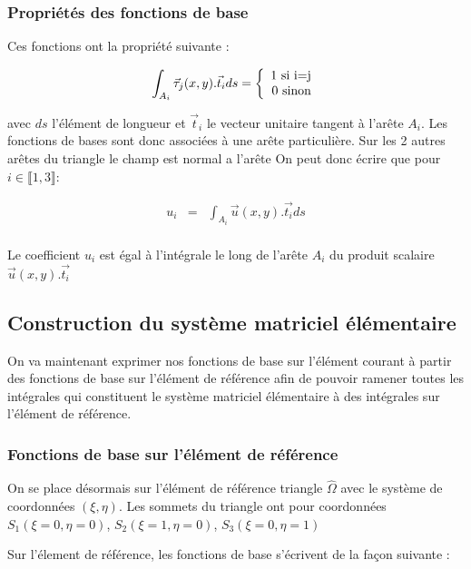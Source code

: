 \documentclass[a4paper,12pt]{article}
\begin{document}
\subsubsection{Propriétés des fonctions de base}
Ces fonctions ont la propriété suivante :

\[
  \int_{A_{i}} {\vec{\tau}_{j}(x,y).\vec{t}_{i} ds} = 
  \left\{
  \begin{array}{r c l}
  \text{1 si i=j}\\
  \text{0 sinon}
  \end{array}
  \right.
\]

avec $ds$ l'élément de longueur et  $\vec{t}_{i}$ le vecteur unitaire tangent à l'arête $A_{i}$. Les fonctions de bases sont donc associées à une arête particulière.
Sur les 2 autres arêtes du triangle le champ est normal a l'arête
On peut donc écrire que pour $i \in \llbracket 1,3 \rrbracket$:

\begin{eqnarray*}
u_{i} &=& \int_{A_{i}} {\vec{u}(x,y).\vec{t_{i}} ds}\\
\end{eqnarray*}

Le coefficient $u_{i}$ est égal à l'intégrale le long de l'arête $A_{i}$ du produit scalaire $\vec{u}(x,y).\vec{t_{i}}$
\subsection{Construction du système matriciel élémentaire}
On va maintenant exprimer nos fonctions de base sur l'élément courant à partir des fonctions de base sur l'élément de référence
afin de pouvoir ramener toutes les intégrales qui constituent le système matriciel élémentaire à des intégrales sur l'élément de référence.
\subsubsection{Fonctions de base sur l'élément de référence}
On se place désormais sur l'élément de référence triangle $\hat{\Omega}$ avec le système de coordonnées $(\xi, \eta)$. 
Les sommets du triangle ont pour coordonnées $S_{1} (\xi = 0, \eta = 0)$, $S_{2} (\xi = 1, \eta = 0)$, $S_{3} (\xi = 0, \eta = 1)$
\begin{center}
\end{center}
Sur l'élement de référence, les fonctions de base s'écrivent de la façon suivante :
\end{document}
